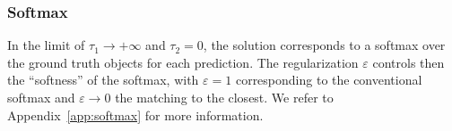 \subsubsection{Softmax}
In the limit of $\tau_1 \rightarrow +\infty$ and $\tau_2 = 0$, the solution corresponds to a softmax over the ground truth objects for each prediction. The regularization $\varepsilon$ controls then the ``softness'' of the softmax, with $\varepsilon = 1$ corresponding to the conventional softmax and $\varepsilon \rightarrow 0$ the matching to the closest. We refer to Appendix~\ref{app:softmax} for more information.

